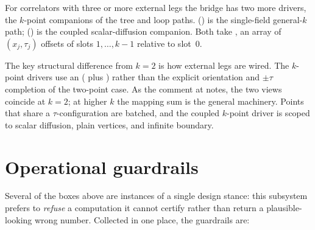 For correlators with three or more external legs the bridge has two more drivers,
the $k$-point companions of the tree and loop paths.
 () is the
single-field general-$k$ path; 
() is the coupled scalar-diffusion companion. Both
take , an array of $(x_{j},\tau_{j})$ offsets of slots
$1,\dots,k-1$ relative to slot~0.

The key structural difference from $k=2$ is how external legs are wired. The
$k$-point drivers use an 
( plus )
rather than the explicit orientation and $\pm\tau$ completion of the two-point
case. As the comment at  notes, the two views
coincide at $k=2$; at higher $k$ the mapping sum is the general machinery. Points
that share a $\tau$-configuration are batched, and the coupled $k$-point driver
is scoped to scalar diffusion, plain vertices, and infinite boundary.

\section{Operational guardrails}

Several of the boxes above are instances of a single design stance: this
subsystem prefers to \emph{refuse} a computation it cannot certify rather than
return a plausible-looking wrong number. Collected in one place, the guardrails
are:

